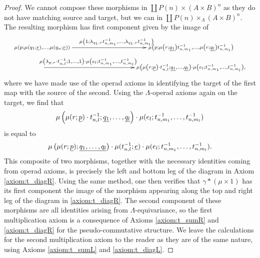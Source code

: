 \begin{proof}
We cannot compose these morphisms in $\coprod P(n) \times (A \times B)^{n}$ as they do not have matching source and target, but we can in $\coprod P(n) \times_{\Lambda} (A \times B)^{n}$. The resulting morphism has first component given by the image of
  \[
    \xy
      {\ar^{\scriptstyle \mu\left(1; \lambda_{q_{1}, r} t^{-1}_{n,m_{1}}, \ldots, \lambda_{q_{1}, r} t^{-1}_{n,m_{l}}\right)} (0,0)*+{\scriptstyle \mu\left(p; \mu\left(q_{1}; \un{r}\right), \ldots, \mu\left(q_{n}; \un{r}\right)\right)}; (75,0)*+{\scriptstyle \mu\left(p; \mu\left(r; \un{q_{1}}\right) t^{-1}_{n,m_{1}}, \ldots, \mu\left(r; \un{q_{l}}\right) t^{-1}_{n,m_{l}} \right)} };
      {\ar^<<<<<<<<<<<<<<<<<<<<<<{\scriptstyle \mu\left(\lambda_{p,r} \cdot t^{-1}_{n,l}; 1, \ldots, 1\right)\cdot \mu\left(e_{l}; t^{-1}_{n,m_{1}}, \ldots, t^{-1}_{n,m_{l}}\right)} (0,-10)*+{}; (75,-10)*+{\scriptstyle \mu\left(\mu\left(r; \un{p}\right)\cdot t^{-1}_{n,l}; \un{q_{1}}, \ldots, \un{q_{l}}\right)\cdot \mu\left(e_{l}; t^{-1}_{n,m_{1}}, \ldots, t^{-1}_{n,m_{l}}\right),} }
    \endxy
  \]
where we have made use of the operad axioms in identifying the target of the first map with the source of the second. Using the $\Lambda$-operad axioms again on the target, we find that
  \[
    \mu\left(\mu(r; \underline{p})\cdot t^{-1}_{n,l}; \underline{q_{1}}, \ldots, \underline{q_{l}}\right)\cdot \mu(e_{l}; t^{-1}_{n,m_{1}}, \ldots, t^{-1}_{n,m_{l}})
  \]
is equal to
  \[
    \mu\left(\mu(r; \underline{p}); \underline{q_{1}, \ldots, q_{l}}\right) \cdot \mu(t^{-1}_{n,l}; \underline{e}) \cdot \mu(e_{l}; t^{-1}_{n,m_{1}}, \ldots, t^{-1}_{n,m_{l}}).
  \]
This composite of two morphisms, together with the necessary identities coming from operad axioms, is precisely the left and bottom leg of the diagram in Axiom \ref{axiom:t_diagR}. Using the same method, one then verifies that $\gamma * (\mu \times 1)$ has its first component the image of the morphism appearing along the top and right leg of the diagram in \ref{axiom:t_diagR}. The second component of these morphisms are all identities arising from $\Lambda$-equivariance, so the first multiplication axiom is a consequence of Axioms \ref{axiom:t_sumR} and \ref{axiom:t_diagR} for the pseudo-commutative structure. We leave the calculations for the second multiplication axiom to the reader as they are of the same nature, using Axioms \ref{axiom:t_sumL} and \ref{axiom:t_diagL}.
\end{proof}

